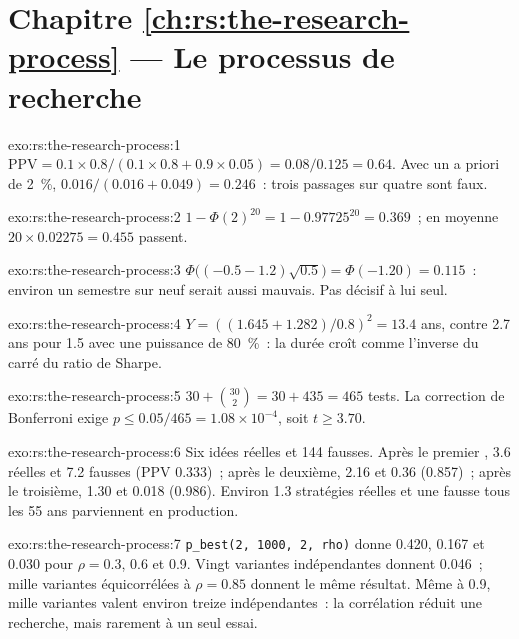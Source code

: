 \section*{Chapitre \ref{ch:rs:the-research-process} --- Le processus de recherche}

\begin{solution}{exo:rs:the-research-process:1}
$\mathrm{PPV} = 0.1 \times 0.8/(0.1 \times 0.8 + 0.9 \times 0.05) = 0.08/0.125 = 0.64$. Avec un a priori de 2~\%, $0.016/(0.016 + 0.049) = 0.246$~:
trois passages sur quatre sont faux.
\end{solution}

\begin{solution}{exo:rs:the-research-process:2}
$1 - \Phi(2)^{20} = 1 - 0.97725^{20} = 0.369$~; en moyenne $20 \times 0.02275 = 0.455$ passent.
\end{solution}

\begin{solution}{exo:rs:the-research-process:3}
$\Phi\bigl((-0.5 - 1.2)\sqrt{0.5}\bigr) = \Phi(-1.20) = 0.115$~: environ un semestre sur neuf serait aussi mauvais. Pas décisif à lui seul.
\end{solution}

\begin{solution}{exo:rs:the-research-process:4}
$Y = ((1.645 + 1.282)/0.8)^2 = 13.4$ ans, contre 2.7 ans pour 1.5 avec une puissance de 80~\%~: la durée croît comme l'inverse du carré
du ratio de Sharpe.
\end{solution}

\begin{solution}{exo:rs:the-research-process:5}
$30 + \binom{30}{2} = 30 + 435 = 465$ tests. La correction de Bonferroni exige $p \le 0.05/465 = 1.08 \times 10^{-4}$, soit $t \ge 3.70$.
\end{solution}

\begin{solution}{exo:rs:the-research-process:6}
Six idées réelles et 144 fausses. Après le premier , 3.6 réelles et 7.2 fausses (PPV 0.333)~; après le deuxième, 2.16 et 0.36 (0.857)~;
après le troisième, 1.30 et 0.018 (0.986). Environ 1.3 stratégies réelles et une fausse tous les 55 ans parviennent en production.
\end{solution}

\begin{solution}{exo:rs:the-research-process:7}
\texttt{p\_best(2, 1000, 2, rho)} donne 0.420, 0.167 et 0.030 pour $\rho = 0.3$, 0.6 et 0.9. Vingt variantes indépendantes donnent 0.046~;
mille variantes équicorrélées à $\rho = 0.85$ donnent le même résultat. Même à 0.9, mille variantes valent environ treize
indépendantes~: la corrélation réduit une recherche, mais rarement à un seul essai.
\end{solution}

